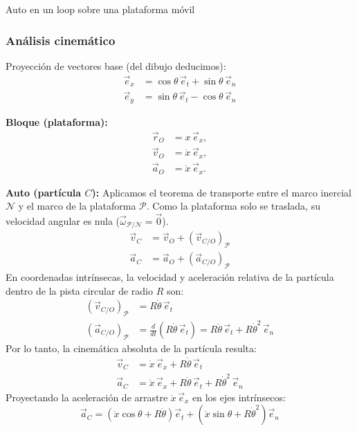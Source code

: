\begin{solucion}{Auto en un loop sobre una plataforma móvil}
\begin{center}
\end{center}

\subsubsection*{Análisis cinemático}

Proyección de vectores base (del dibujo deducimos):
\begin{align}
    \vec{e}_x &= \cos\theta\,\vec{e}_t + \sin\theta\,\vec{e}_n \\
    \vec{e}_y &= \sin\theta\,\vec{e}_t - \cos\theta\,\vec{e}_n
\end{align}

\textbf{Bloque (plataforma):}
\begin{align}
\vec{r}_O &= x\,\vec{e}_x, \\
\vec{v}_O &= \dot{x}\,\vec{e}_x, \\
\vec{a}_O &= \ddot{x}\,\vec{e}_x.
\end{align}

\textbf{Auto (partícula $C$):}
Aplicamos el teorema de transporte entre el marco inercial $\mathcal{N}$ y el marco de la plataforma $\mathcal{P}$. Como la plataforma solo se traslada, su velocidad angular es nula ($\vec{\omega}_{\mathcal{P}/\mathcal{N}} = \vec{0}$).
\begin{align}
\vec{v}_C &= \vec{v}_O + (\vec{v}_{C/O})_{\mathcal{P}} \\
\vec{a}_C &= \vec{a}_O + (\vec{a}_{C/O})_{\mathcal{P}}
\end{align}
En coordenadas intrínsecas, la velocidad y aceleración relativa de la partícula dentro de la pista circular de radio $R$ son:
\begin{align}
(\vec{v}_{C/O})_{\mathcal{P}} &= R\dot{\theta}\,\vec{e}_t \\
(\vec{a}_{C/O})_{\mathcal{P}} &= \frac{d}{dt}(R\dot{\theta}\,\vec{e}_t) = R\ddot{\theta}\,\vec{e}_t + R\dot{\theta}^2\,\vec{e}_n
\end{align}
Por lo tanto, la cinemática absoluta de la partícula resulta:
\begin{align}
\vec{v}_C &= \dot{x}\,\vec{e}_x + R\dot{\theta}\,\vec{e}_t \\
\vec{a}_C &= \ddot{x}\,\vec{e}_x + R\ddot{\theta}\,\vec{e}_t + R\dot{\theta}^2\,\vec{e}_n
\end{align}
Proyectando la aceleración de arrastre $\ddot{x}\,\vec{e}_x$ en los ejes intrínsecos:
\begin{equation}
\vec{a}_C = \left(\ddot{x}\cos\theta + R\ddot{\theta}\right)\vec{e}_t + \left(\ddot{x}\sin\theta + R\dot{\theta}^2\right)\vec{e}_n
\end{equation}


\end{solucion}
